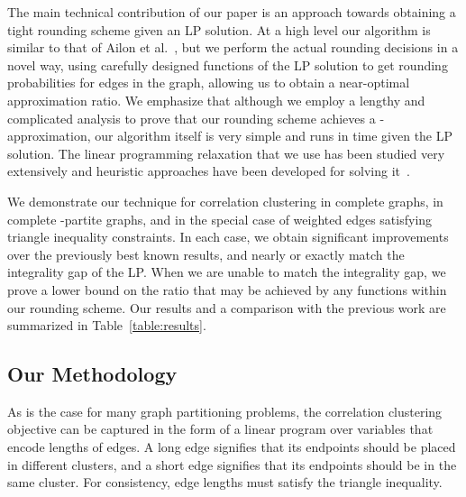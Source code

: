 \documentclass[11pt]{article}
\theoremstyle{definition}
\theoremstyle{remark}
\begin{document}
The main technical contribution of our paper is an approach towards obtaining
a tight rounding scheme given an LP solution. At a high level our algorithm
is similar to that of Ailon et al.~\cite{ACN08}, but we perform the actual rounding decisions
in a novel way, using carefully designed functions of the LP solution to get
rounding probabilities for edges in the graph, allowing us to obtain a
near-optimal approximation ratio.
We emphasize that although we employ a lengthy and complicated analysis
to prove that our rounding scheme achieves a -approximation,
our algorithm itself is very simple and runs in time  given the LP solution.
The linear programming relaxation that we use has been studied very extensively and heuristic approaches have been developed for solving it~\cite{DSW10}.

 We demonstrate our technique for correlation clustering in complete
graphs, in complete -partite graphs, and in the special case of weighted edges
satisfying triangle inequality constraints.
In each case, we obtain significant improvements over the previously best known
results, and nearly or exactly match the integrality gap of the LP.
When we are unable to match the integrality gap, we prove a lower bound on the
ratio that may be achieved by any functions within our rounding scheme.  Our
results and a comparison with the previous work are summarized in
Table~\ref{table:results}.

\subsection{Our Methodology}

As is the case for many graph partitioning problems, the correlation clustering
objective can be captured in the form of a linear program over variables that
encode lengths of edges. A long edge signifies that its endpoints should be
placed in different clusters, and a short edge signifies that its endpoints
should be in the same cluster. For consistency, edge lengths must satisfy the
triangle inequality.
\end{document}
